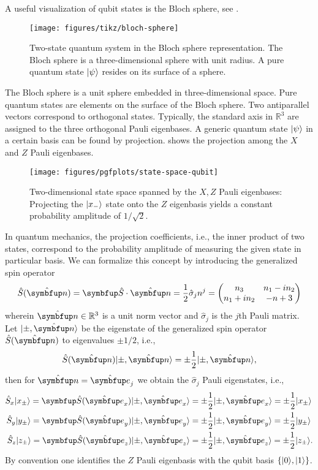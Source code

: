 A useful visualization of qubit states is the Bloch sphere, see .
\begin{figure}[htb]
	\centering
	\texttt{[image: figures/tikz/bloch-sphere]}
	\caption{Two-state quantum system in the Bloch sphere representation. The Bloch sphere is a three-dimensional sphere with unit radius. A pure quantum state  $\lvert\psi\rangle$ resides on its surface of a sphere.}\label{fig:bloch_sphere}
\end{figure}
The Bloch sphere is a unit sphere embedded in three-dimensional space.
Pure quantum states are elements on the surface of the Bloch sphere.
Two antiparallel vectors correspond to orthogonal states.
Typically, the standard axis in $\mathbb{R}^3$ are assigned to the three orthogonal Pauli eigenbases.
A generic quantum state $\lvert\psi\rangle$ in a certain basis can be found by projection.
 shows the projection among the $X$ and $Z$ Pauli eigenbases.
\begin{figure}[htb]
	\centering
	\texttt{[image: figures/pgfplots/state-space-qubit]}
	\caption{Two-dimensional state space spanned by the $X,Z$ Pauli eigenbases: Projecting the $\lvert x_-\rangle$ state onto the $Z$ eigenbasis yields a constant probability amplitude of $1/\sqrt{2}$.}\label{fig:state_space_qubit}
\end{figure}
In quantum mechanics, the projection coefficients, i.e., the inner product of two states, correspond to the probability amplitude of measuring the given state in particular basis.
We can formalize this concept by introducing the generalized spin operator
\begin{equation}
	\hat{S}(\vu{n})
	=
	\vb{\hat{S}}\vdot\vu{n}
	=
	\frac{1}{2}
	\hat{\sigma}_jn^j
	=
	\begin{pmatrix}
		n_3 & n_1 - in_2 \\
		n_1 + in_2 & -n+3
	\end{pmatrix}
\end{equation}
wherein $\vu{n}\in\mathbb{R}^3$ is a unit norm vector and $\hat{\sigma}_j$ is the $j$th Pauli matrix.
Let $\ket{\pm,\vu{n}}$ be the eigenstate of the generalized spin operator $\hat{S}(\vu{n})$ to eigenvalues $\pm1/2$, i.e.,
\begin{equation}
	\hat{S}(\vu{n})
	\ket{\pm,\vu{n}}
	=
	\pm\frac{1}{2}
	\ket{\pm,\vu{n}},
\end{equation}
then for $\vu{n}=\vu{e}_j$ we obtain the $\hat{\sigma}_j$ Pauli eigenstates, i.e.,
\begin{align}
	\hat{S}_x
	\ket{x_\pm}
	=	
	\vb{\hat{S}}(\vu{e}_x)
	\ket{\pm,\vu{e}_x}
	&=
	\pm\frac{1}{2}
	\ket{\pm,\vu{e}_x}
	=
	\pm\frac{1}{2}
	\ket{x_\pm}
	\\
	\hat{S}_y
	\ket{y_\pm}
	=	
	\vb{\hat{S}}(\vu{e}_y)
	\ket{\pm,\vu{e}_y}
	&=
	\pm\frac{1}{2}
	\ket{\pm,\vu{e}_y}
	=
	\pm\frac{1}{2}
	\ket{y_\pm}
	\\
	\hat{S}_z
	\ket{z_\pm}
	=	
	\vb{\hat{S}}(\vu{e}_z)
	\ket{\pm,\vu{e}_z}
	&=
	\pm\frac{1}{2}
	\ket{\pm,\vu{e}_z}
	=
	\pm\frac{1}{2}
	\ket{z_\pm}
	.
\end{align}
By convention one identifies the $Z$ Pauli eigenbasis with the qubit basis $\left\{\lvert0\rangle,\lvert1\rangle\right\}$.

